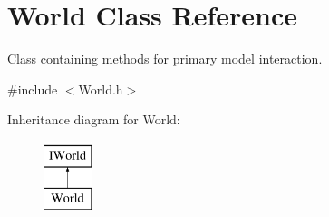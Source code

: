 \hypertarget{classWorld}{\section{World Class Reference}
\label{classWorld}
}


Class containing methods for primary model interaction.  




{\ttfamily \#include $<$World.\-h$>$}

Inheritance diagram for World\-:\begin{figure}[H]
\begin{center}
\leavevmode
\includegraphics[height=2.000000cm]{classWorld}
\end{center}
\end{figure}
